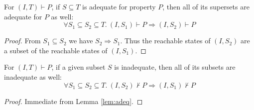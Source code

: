 
\begin{lemma}
\label{lem:adeq}
For $(I, T) \vdash P$, if $S \subseteq T$ is adequate for property $P$, then all of its supersets are adequate for $P$ as well:
\allowbreak $$\forall S_1 \subseteq S_2 \subseteq T.~ (I, S_1) \vdash P \Rightarrow (I, S_2) \vdash P$$
\end{lemma}
\begin{proof}
From $S_1 \subseteq S_2$ we have $S_2 \Rightarrow S_1$. Thus the
  reachable states of $(I, S_2)$ are a subset of the reachable states
  of $(I, S_1)$.
\end{proof}

\begin{corollary}
\label{lem:inadeq}
For $(I, T) \vdash P$, if a given subset $S$ is inadequate, then all of its subsets are inadequate as well:
\allowbreak $$\forall S_1 \subseteq S_2 \subseteq T.~ (I, S_2) \nvdash P \Rightarrow (I, S_1) \nvdash P$$
\end{corollary}
\begin{proof}
  Immediate from Lemma \ref{lem:adeq}.
\end{proof}


